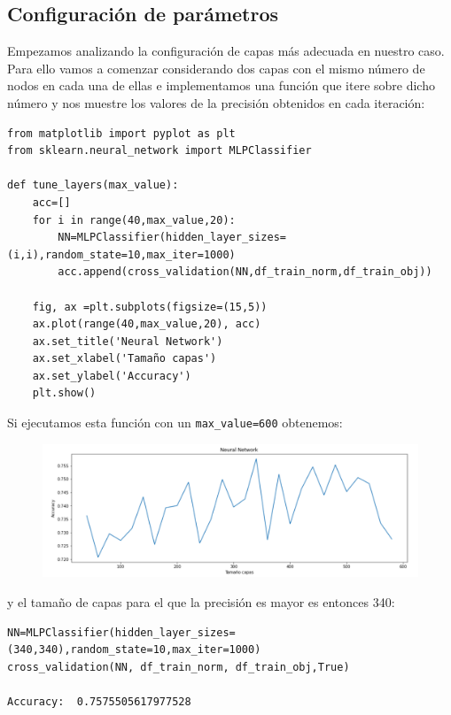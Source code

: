 \documentclass[a4paper,11pt]{article}
\begin{document}
\subsection{Configuración de parámetros}
Empezamos analizando la configuración de capas más adecuada en nuestro caso. Para ello vamos a comenzar considerando dos capas con el mismo número de nodos en cada una de ellas e implementamos una función que itere sobre dicho número y nos muestre los valores de la precisión obtenidos en cada iteración:
\begin{verbatim}
from matplotlib import pyplot as plt
from sklearn.neural_network import MLPClassifier

def tune_layers(max_value):
	acc=[]
	for i in range(40,max_value,20):
		NN=MLPClassifier(hidden_layer_sizes=(i,i),random_state=10,max_iter=1000)
		acc.append(cross_validation(NN,df_train_norm,df_train_obj))
	
	fig, ax =plt.subplots(figsize=(15,5))
	ax.plot(range(40,max_value,20), acc)
	ax.set_title('Neural Network')
	ax.set_xlabel('Tamaño capas')
	ax.set_ylabel('Accuracy')
	plt.show()
\end{verbatim}
Si ejecutamos esta función con un \texttt{max_value=600} obtenemos:
\begin{figure}[H]
	\centering
	\includegraphics[width=0.9\linewidth]{img/nn1}
	\caption{}
	\label{fig:nn1}
\end{figure}

y el tamaño de capas para el que la precisión es mayor es entonces 340: 
\begin{verbatim}
NN=MLPClassifier(hidden_layer_sizes=(340,340),random_state=10,max_iter=1000)
cross_validation(NN, df_train_norm, df_train_obj,True)

Accuracy:  0.7575505617977528
\end{verbatim}
\end{document}
